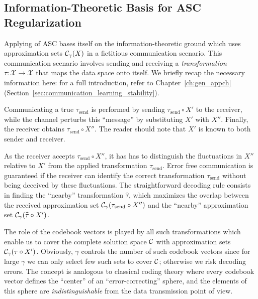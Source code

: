 \subsection{Information-Theoretic Basis for ASC Regularization}
\label{sec:ASReg}

Applying of ASC bases itself on the information-theoretic ground which uses
approximation sets ${\cal C}_{\gamma}(X)$ in a fictitious communication scenario.
This communication scenario involves sending and receiving a
\emph{transformation} $\tau\colon
\mathcal{X} \to \mathcal{X}$ that maps the data space onto
itself. We briefly recap the necessary information here: for a full
introduction, refer to Chapter~\ref{ch:gen_appch}
(Section~\ref{sec:communication_learning_stability}).

Communicating a true $\tau_{\mathrm{send}}$ is performed by sending ${\tau_{\mathrm{send}} \circ
X'}$ to the receiver, while the channel perturbs this ``message''
by substituting $X'$ with $X''$. Finally, the receiver obtains
$\tau_{\mathrm{send}} \circ X''$. The reader should note that $X'$ is known to
both sender and receiver.

As the receiver 
accepts $\tau_{\mathrm{send}} \circ X''$, it has has to distinguish the
fluctuations in $X''$ relative to $X'$ from the applied
transformation $\tau_{\mathrm{send}}$. Error free communication is guaranteed if the
receiver can identify the correct transformation $\tau_{\mathrm{send}}$ without
being deceived by these fluctuations.  The straightforward decoding
rule consists in finding the ``nearby'' transformation $\hat \tau$,
which maximizes the overlap between the received approximation set
${\cal C}_\gamma(\tau_{\mathrm{send}} \circ X'')$ and the ``nearby'' approximation set
${\cal C}_\gamma(\widehat\tau \circ X')$.

The role of the codebook vectors is played by all such transformations
which enable us to cover the complete solution space ${\cal C}$
with approximation sets ${\cal C}_\gamma(\tau \circ X')$. Obviously,
$\gamma$ controls the number of such codebook vectors since for large
$\gamma$ we can only select few such sets to cover ${\cal C}$;
otherwise we risk decoding errors. The concept is analogous to
classical coding theory where every codebook vector defines the
``center'' of an ``error-correcting'' sphere, and the elements of this
sphere are \emph{indistinguishable} from the data transmission point
of view.

